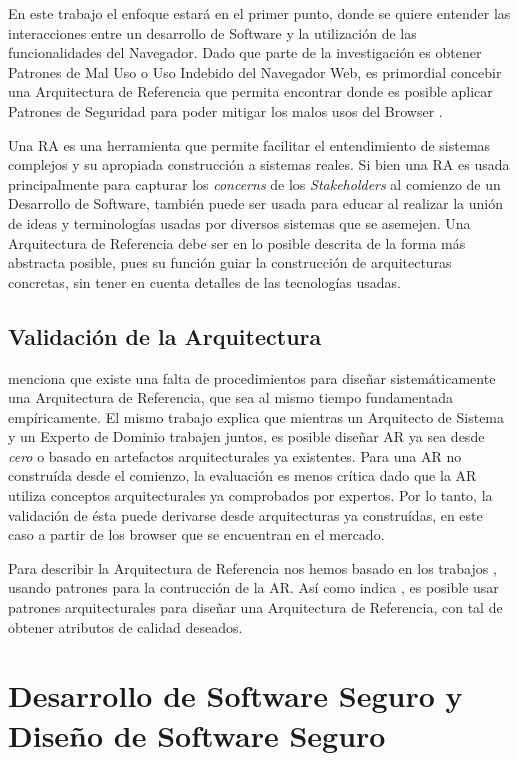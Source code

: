 En este trabajo el enfoque estará en el primer punto, donde se quiere entender las interacciones entre un desarrollo de Software y la utilización de las funcionalidades del Navegador. Dado que parte de la investigación es obtener Patrones de Mal Uso o Uso Indebido del Navegador Web, es primordial concebir una Arquitectura de Referencia que permita encontrar donde es posible aplicar Patrones de Seguridad para poder mitigar los malos usos del Browser \cite{Submitted2014}. 

Una RA es una herramienta que permite facilitar el entendimiento de sistemas complejos y su apropiada construcción a sistemas reales. Si bien una RA es usada principalmente para capturar los \textit{concerns} de los \textit{Stakeholders} al comienzo de un Desarrollo de Software, también puede ser usada para educar al realizar la unión de ideas y terminologías usadas por diversos sistemas que se asemejen. Una Arquitectura de Referencia debe ser en lo posible descrita de la forma más abstracta posible, pues su función guiar la construcción de arquitecturas concretas, sin tener en cuenta detalles de las tecnologías usadas. 

\subsection{Validación de la Arquitectura}
    \cite{Galster2011a} menciona que existe una falta de procedimientos para diseñar sistemáticamente una Arquitectura de Referencia, que sea al mismo tiempo fundamentada empíricamente. El mismo trabajo explica que mientras un Arquitecto de Sistema y un Experto de Dominio trabajen juntos, es posible diseñar AR ya sea desde \textit{cero} o basado en artefactos arquitecturales ya existentes. Para una AR no construída desde el comienzo, la evaluación es menos crítica dado que la AR utiliza conceptos arquitecturales ya comprobados por expertos. Por lo tanto, la validación de ésta puede derivarse desde arquitecturas ya construídas, en este caso a partir de los browser que se encuentran en el mercado.

    Para describir la Arquitectura de Referencia nos hemos basado en los trabajos \cite{Hashizume2014Reference, Submitted2014}, usando patrones para la contrucción de la AR. Así como indica \cite{Bass2012}, es posible usar patrones arquitecturales para diseñar una Arquitectura de Referencia, con tal de obtener atributos de calidad deseados.



\section{Desarrollo de Software Seguro y Diseño de Software Seguro}
\label{chap2:SSD}

